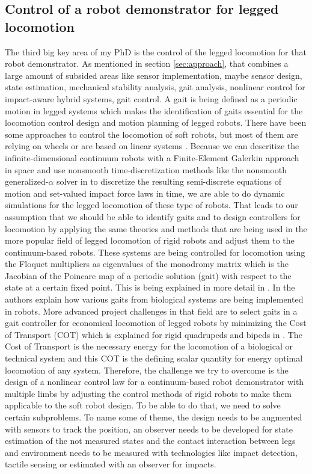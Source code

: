 \subsection*{Control of a robot demonstrator for legged locomotion} \label{sub:Control}
%
The third big key area of my PhD is the control of the legged locomotion for that robot demonstrator. As mentioned in section \ref{sec:approach}, that combines a large amount of subsided
areas like sensor implementation, maybe sensor design, state estimation, mechanical stability analysis, gait analysis, nonlinear control for impact-aware hybrid systems, gait control.
A gait is being defined as a periodic motion in legged systems which makes the identification of gaits essential for the locomotion control design and motion planning 
of legged robots. There have been some approaches to control the locomotion of soft robots, but most of them are relying on wheels \cite{Walker2011_conf}
or are based on linear systems \cite{Huang2020}.
Because we can descritize the infinite-dimensional continuum robots with a Finite-Element Galerkin approach in space and use nonsmooth time-discretization methods like
 the nonsmooth generalized-$\alpha$ solver in \cite{Capobianco2021} to discretize the resulting semi-discrete equations of motion and set-valued impact force laws in time, we are able to do dynamic simulations for the 
 legged locomotion of these type of robots. That leads to our assumption that we should be able to identify gaits and to design controllers for locomotion 
by applying the same theories and methods that are being used in the more popular field of legged locomotion of rigid robots and adjust them to
 the continuum-based robots. These systems are being controlled for locomotion using the Floquet multipliers as eigenvalues of the monodromy matrix
  which is the Jacobian of the Poincare map of a periodic solution (gait) with respect to the state at a certain fixed point. This is being explained in more detail in \cite{Grizzle2014,Raff2022,Remy2011_conf}.
 In \cite{Yesilevskiy2018} the authors explain how various gaits from biological systems are being implemented in robots. 
  More advanced project challenges in that field are to select gaits in a gait controller for economical locomotion of legged robots by minimizing the Cost of Transport (COT) which
  is explained for rigid quadrupeds and bipeds in \cite{Xi2016}. The Cost of Transport is the necessary energy for the locomotion of a biological or technical system and this COT is 
  the defining scalar quantity for energy optimal locomotion of any system. Therefore, the challenge we try to overcome is the design of a nonlinear control law for a continuum-based
  robot demonstrator with multiple limbs by adjusting the control methods of rigid robots to make them applicable to the soft robot design. To be able to do that, we need to solve certain
  subproblems. To name some of theme, the design needs to be augmented with sensors to track the position, an observer needs to be developed for state estimation of the not measured states and
  the contact interaction between legs and environment needs to be measured with technologies like impact detection, tactile sensing or estimated with an observer for impacts.  



